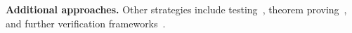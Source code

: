\smallskip
\noindent
\textbf{Additional approaches.}
Other strategies include testing~\cite{WiGo93,PrGr12,PrGr13,EmEn17,Lo17}, theorem proving~\cite{CoDoGr05,DeScWe11}, and further verification frameworks~\cite{BoEmEnMu17,FeEnMoRiSh18,EnKo24}.






